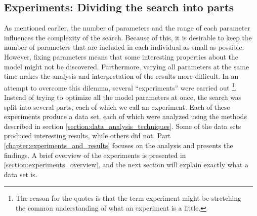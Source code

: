 \subsection{Experiments: Dividing the search into parts}\label{section:datasets_introduction}
As mentioned earlier, the number of parameters and the range of each parameter influences the complexity of the search. Because of this, it is desirable to keep the number of parameters that are included in each individual as small as possible. However, fixing parameters means that some interesting properties about the model might not be discovered. Furthermore, varying all parameters at the same time makes the analysis and interpretation of the results more difficult. In an attempt to overcome this dilemma, several ``experiments'' were carried out \footnote{The reason for the quotes is that the term experiment might be stretching the common understanding of what an experiment is a little.}. Instead of trying to optimize all the model parameters at once, the search was split into several parts, each of which we call an experiment. Each of these experiments produce a data set, each of which were analyzed using the methods described in section \ref{section:data_analysis_techniques}. Some of the data sets produced interesting results, while others did not. Part \ref{chapter:experiments_and_results} focuses on the analysis and presents the findings. A brief overview of the experiments is presented in \ref{section:experiments_overview}, and the next section will explain exactly what a data set is.

